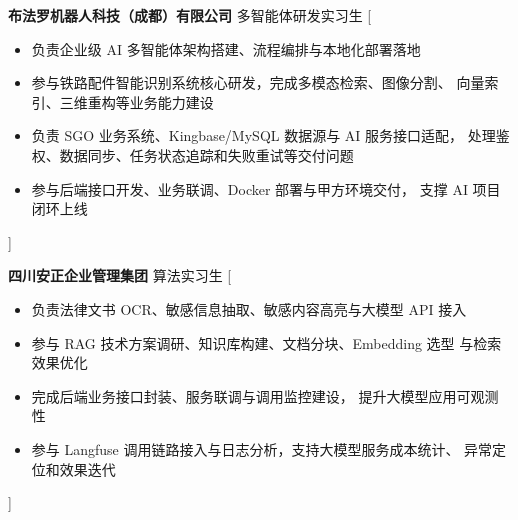 \documentclass[zh]{resume}
\begin{document}
\makeheader

\begin{abstract}
计算机技术硕士在读，具备大模型应用、多模态检索、计算机视觉与后端工程化
落地经验。曾参与铁路配件智能识别、企业文档脱敏、医学报告质控等 AI 项目，
熟悉从模型适配、检索链路、业务接口到 Docker 部署的完整交付流程。技术栈覆盖
RAG、Agent、向量检索、图像分割、OCR、FastAPI、Milvus、MinIO、MySQL 等。
\end{abstract}

\begin{competences}[9em]
\end{competences}

\begin{experiences}
    {\textbf{布法罗机器人科技（成都）有限公司} \textbullet 多智能体研发实习生}%
    [\begin{itemize}
      \item 负责企业级 AI 多智能体架构搭建、流程编排与本地化部署落地
      \item 参与铁路配件智能识别系统核心研发，完成多模态检索、图像分割、
        向量索引、三维重构等业务能力建设
      \item 负责 SGO 业务系统、Kingbase/MySQL 数据源与 AI 服务接口适配，
        处理鉴权、数据同步、任务状态追踪和失败重试等交付问题
      \item 参与后端接口开发、业务联调、Docker 部署与甲方环境交付，
        支撑 AI 项目闭环上线
    \end{itemize}]

  \separator{0.8ex}
    {\textbf{四川安正企业管理集团} \textbullet 算法实习生}%
    [\begin{itemize}
      \item 负责法律文书 OCR、敏感信息抽取、敏感内容高亮与大模型 API 接入
      \item 参与 RAG 技术方案调研、知识库构建、文档分块、Embedding 选型
        与检索效果优化
      \item 完成后端业务接口封装、服务联调与调用监控建设，
        提升大模型应用可观测性
      \item 参与 Langfuse 调用链路接入与日志分析，支持大模型服务成本统计、
        异常定位和效果迭代
    \end{itemize}]
\end{experiences}
\end{document}
